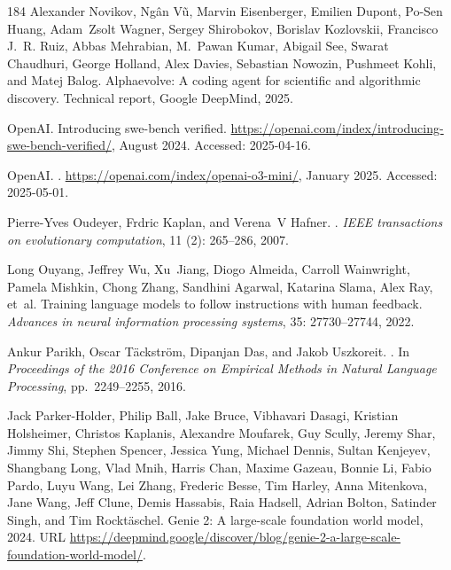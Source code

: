 \begin{thebibliography}{184}
Alexander Novikov, Ngân Vũ, Marvin Eisenberger, Emilien Dupont, Po-Sen Huang,
  Adam~Zsolt Wagner, Sergey Shirobokov, Borislav Kozlovskii, Francisco J.~R.
  Ruiz, Abbas Mehrabian, M.~Pawan Kumar, Abigail See, Swarat Chaudhuri, George
  Holland, Alex Davies, Sebastian Nowozin, Pushmeet Kohli, and Matej Balog.
\newblock Alphaevolve: A coding agent for scientific and algorithmic discovery.
\newblock Technical report, Google DeepMind, 2025.

{OpenAI}.
\newblock Introducing swe-bench verified.
\newblock \url{https://openai.com/index/introducing-swe-bench-verified/},
  August 2024.
\newblock Accessed: 2025-04-16.

{OpenAI}.
.
\newblock \url{https://openai.com/index/openai-o3-mini/}, January 2025.
\newblock Accessed: 2025-05-01.

Pierre-Yves Oudeyer, Frdric Kaplan, and Verena~V Hafner.
.
\newblock \emph{IEEE transactions on evolutionary computation}, 11
  (2): 265--286, 2007.

Long Ouyang, Jeffrey Wu, Xu~Jiang, Diogo Almeida, Carroll Wainwright, Pamela
  Mishkin, Chong Zhang, Sandhini Agarwal, Katarina Slama, Alex Ray, et~al.
\newblock Training language models to follow instructions with human feedback.
\newblock \emph{Advances in neural information processing systems},
  35: 27730--27744, 2022.

Ankur Parikh, Oscar T{\"a}ckstr{\"o}m, Dipanjan Das, and Jakob Uszkoreit.
.
\newblock In \emph{Proceedings of the 2016 Conference on Empirical Methods in
  Natural Language Processing}, pp.\  2249--2255, 2016.

Jack Parker-Holder, Philip Ball, Jake Bruce, Vibhavari Dasagi, Kristian
  Holsheimer, Christos Kaplanis, Alexandre Moufarek, Guy Scully, Jeremy Shar,
  Jimmy Shi, Stephen Spencer, Jessica Yung, Michael Dennis, Sultan Kenjeyev,
  Shangbang Long, Vlad Mnih, Harris Chan, Maxime Gazeau, Bonnie Li, Fabio
  Pardo, Luyu Wang, Lei Zhang, Frederic Besse, Tim Harley, Anna Mitenkova, Jane
  Wang, Jeff Clune, Demis Hassabis, Raia Hadsell, Adrian Bolton, Satinder
  Singh, and Tim Rockt{\"a}schel.
\newblock Genie 2: A large-scale foundation world model, 2024.
\newblock URL
  \url{https://deepmind.google/discover/blog/genie-2-a-large-scale-foundation-world-model/}.


\end{thebibliography}

